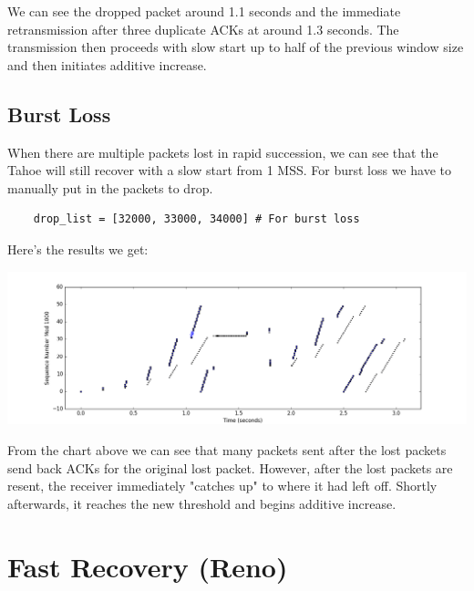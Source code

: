 \documentclass[11pt]{article}
\begin{document}
\vspace{5mm}

We can see the dropped packet around 1.1 seconds and the immediate retransmission after three duplicate ACKs at around 1.3 seconds. The transmission then proceeds with slow start up to half of the previous window size and then initiates additive increase.

\subsection{Burst Loss}

When there are multiple packets lost in rapid succession, we can see that the Tahoe will still recover with a slow start from 1 MSS. For burst loss we have to manually put in the packets to drop.

\vspace{5mm}

\begin{lstlisting}
    drop_list = [32000, 33000, 34000] # For burst loss
\end{lstlisting}

\vspace{5mm}

Here's the results we get:

\vspace{5mm}

\includegraphics[width=17cm]{charts/burstloss.png}

\vspace{5mm}

From the chart above we can see that many packets sent after the lost packets send back ACKs for the original lost packet. However, after the lost packets are resent, the receiver immediately "catches up" to where it had left off. Shortly afterwards, it reaches the new threshold and begins additive increase.

\section{Fast Recovery (Reno)}
\end{document}
